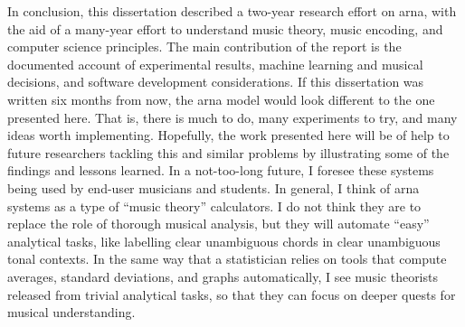 
In conclusion, this dissertation described a two-year
research effort on \gls{arna}, with the aid of a many-year
effort to understand music theory, music encoding, and
computer science principles. The main contribution of the
report is the documented account of experimental results,
machine learning and musical decisions, and software
development considerations. If this dissertation was written
six months from now, the \gls{arna} model would look
different to the one presented here. That is, there is much
to do, many experiments to try, and many ideas worth
implementing. Hopefully, the work presented here will be of
help to future researchers tackling this and similar
problems by illustrating some of the findings and lessons
learned. In a not-too-long future, I foresee these systems
being used by end-user musicians and students. In general, I
think of \gls{arna} systems as a type of ``music theory''
calculators. I do not think they are to replace the role of
thorough musical analysis, but they will automate ``easy''
analytical tasks, like labelling clear unambiguous chords in
clear unambiguous tonal contexts. In the same way that a
statistician relies on tools that compute averages, standard
deviations, and graphs automatically, I see music theorists
released from trivial analytical tasks, so that they can
focus on deeper quests for musical understanding. 
